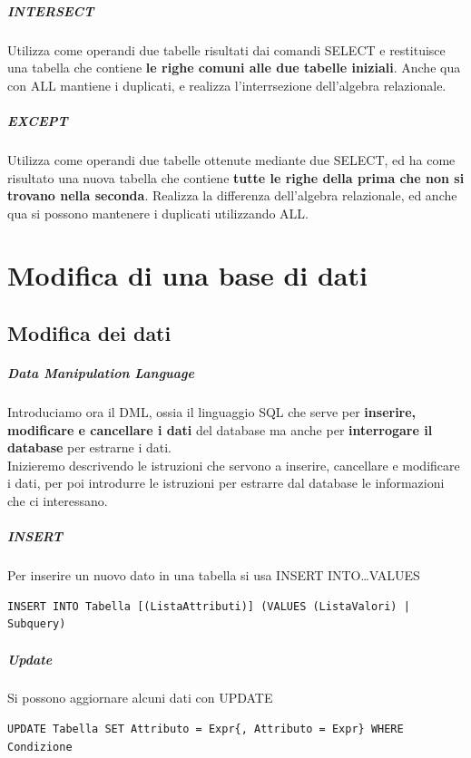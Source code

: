\documentclass[10pt]{book}
\begin{document}
\paragraph{INTERSECT} Utilizza come operandi due tabelle risultati dai comandi SELECT e restituisce una tabella che contiene \textbf{le righe comuni alle due tabelle iniziali}. Anche qua con ALL mantiene i duplicati, e realizza l'interrsezione dell'algebra relazionale.
\paragraph{EXCEPT} Utilizza come operandi due tabelle ottenute mediante due SELECT, ed ha come risultato una nuova tabella che contiene \textbf{tutte le righe della prima che non si trovano nella seconda}. Realizza la differenza dell'algebra relazionale, ed anche qua si possono mantenere i duplicati utilizzando ALL.
\chapter{Modifica di una base di dati}
\section{Modifica dei dati}
\paragraph{Data Manipulation Language} Introduciamo ora il DML, ossia il linguaggio SQL che serve per \textbf{inserire, modificare e cancellare i dati} del database ma anche per \textbf{interrogare il database} per estrarne i dati.\\
Inizieremo descrivendo le istruzioni che servono a inserire, cancellare e modificare i dati, per poi introdurre le istruzioni per estrarre dal database le informazioni che ci interessano.
\paragraph{INSERT} Per inserire un nuovo dato in una tabella si usa INSERT INTO\ldots VALUES
\begin{lstlisting}
INSERT INTO Tabella [(ListaAttributi)] (VALUES (ListaValori) | Subquery)
\end{lstlisting}
\paragraph{Update} Si possono aggiornare alcuni dati con UPDATE
\begin{lstlisting}
UPDATE Tabella SET Attributo = Expr{, Attributo = Expr} WHERE Condizione
\end{lstlisting}
\end{document}
